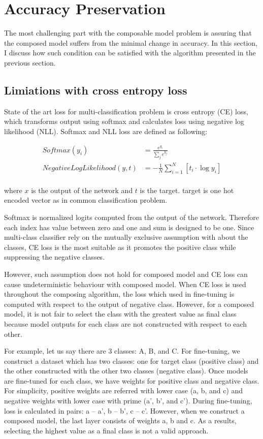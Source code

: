 \documentclass{article}
\begin{document}
\section{Accuracy Preservation}

The most challenging part with the composable model problem is assuring that the composed model suffers from the minimal change in accuracy. In this section, I discuss how such condition can be satisfied with the algorithm presented in the previous section.

\subsection{Limiations with cross entropy loss}

State of the art loss for multi-classification problem is cross entropy (CE) loss, which transforms output using softmax and calculates loss using negative log likelihood (NLL).
Softmax and NLL loss are defined as following:

\begin{align*}
Softmax(y_i) &= \frac{e^{y_i}}{\sum_{j}e^{y_j}} \\
NegativeLogLikelihood(y, t) & = -\frac{1}{N}\sum_{i=1}^N \left[ t_i \cdot \log y_i\right] \\
\end{align*}

where $x$ is the output of the network and $t$ is the target. target is one hot encoded vector as in common classification problem.

Softmax is normalized logits computed from the output of the network. Therefore each index has value between zero and one and sum is designed to be one. Since multi-class classifier rely on the mutually exclusive assumption with about the classes, CE loss is the most suitable as it promotes the positive class while suppressing the negative classes.

However, such assumption does not hold for composed model and CE loss can cause undeterministic behaviour with composed model. When CE loss is used throughout the composing algorithm, the loss which used in fine-tuning is computed with respect to the output of negative class. However, for a composed model, it is not fair to select the class with the greatest value as final class because model outputs for each class are not constructed with respect to each other.

For example, let us say there are 3 classes: A, B, and C. For fine-tuning, we construct a dataset which has two classes: one for target class (positive class) and the other constructed with the other two classes (negative class). Once models are fine-tuned for each class, we have weights for positive class and negative class. For simplicity, positive weights are referred with lower case (a, b, and c) and negative weights with lower case with prime (a', b', and c'). During fine-tuning, loss is calculated in pairs: a -- a', b -- b', c -- c'. However, when we construct a composed model, the last layer consists of weights a, b and c. As a results, selecting the highest value as a final class is not a valid approach.
\end{document}
